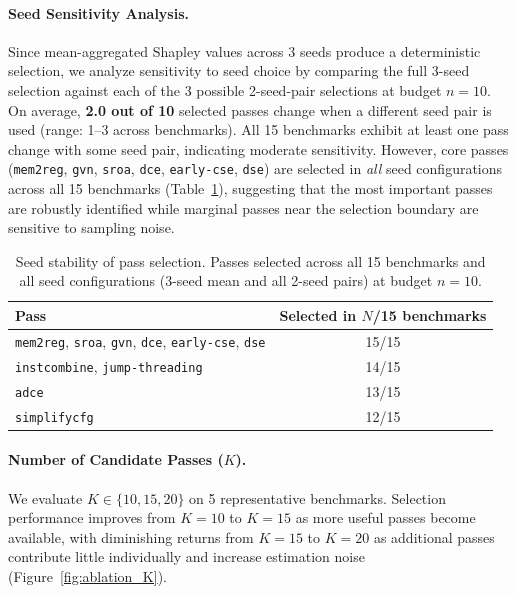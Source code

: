 \documentclass[preprint]{article}
\begin{document}
\paragraph{Seed Sensitivity Analysis.}
Since mean-aggregated Shapley values across 3 seeds produce a deterministic selection, we analyze sensitivity to seed choice by comparing the full 3-seed selection against each of the 3 possible 2-seed-pair selections at budget $n{=}10$. On average, \textbf{2.0 out of 10} selected passes change when a different seed pair is used (range: 1--3 across benchmarks). All 15 benchmarks exhibit at least one pass change with some seed pair, indicating moderate sensitivity. However, core passes (\texttt{mem2reg}, \texttt{gvn}, \texttt{sroa}, \texttt{dce}, \texttt{early-cse}, \texttt{dse}) are selected in \emph{all} seed configurations across all 15 benchmarks (Table~\ref{tab:seed_stability}), suggesting that the most important passes are robustly identified while marginal passes near the selection boundary are sensitive to sampling noise.

\begin{table}[t]
\caption{Seed stability of pass selection. Passes selected across all 15 benchmarks and all seed configurations (3-seed mean and all 2-seed pairs) at budget $n{=}10$.}
\label{tab:seed_stability}
\centering
\small
\begin{tabular}{lc}
\toprule
Pass & Selected in $N$/15 benchmarks \\
\midrule
\texttt{mem2reg}, \texttt{sroa}, \texttt{gvn}, \texttt{dce}, \texttt{early-cse}, \texttt{dse} & 15/15 \\
\texttt{instcombine}, \texttt{jump-threading} & 14/15 \\
\texttt{adce} & 13/15 \\
\texttt{simplifycfg} & 12/15 \\
\bottomrule
\end{tabular}
\end{table}

\paragraph{Number of Candidate Passes ($K$).}
We evaluate $K \in \{10, 15, 20\}$ on 5 representative benchmarks. Selection performance improves from $K{=}10$ to $K{=}15$ as more useful passes become available, with diminishing returns from $K{=}15$ to $K{=}20$ as additional passes contribute little individually and increase estimation noise (Figure~\ref{fig:ablation_K}).
\end{document}

